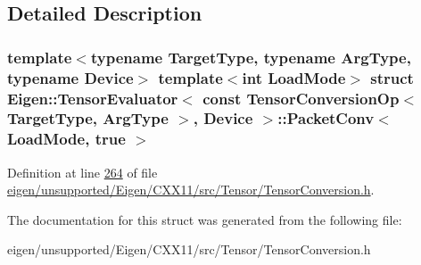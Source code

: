 \subsection{Detailed Description}
\subsubsection*{template$<$typename Target\+Type, typename Arg\+Type, typename Device$>$\newline
template$<$int Load\+Mode$>$\newline
struct Eigen\+::\+Tensor\+Evaluator$<$ const Tensor\+Conversion\+Op$<$ Target\+Type, Arg\+Type $>$, Device $>$\+::\+Packet\+Conv$<$ Load\+Mode, true $>$}



Definition at line \hyperlink{eigen_2unsupported_2_eigen_2_c_x_x11_2src_2_tensor_2_tensor_conversion_8h_source_l00264}{264} of file \hyperlink{eigen_2unsupported_2_eigen_2_c_x_x11_2src_2_tensor_2_tensor_conversion_8h_source}{eigen/unsupported/\+Eigen/\+C\+X\+X11/src/\+Tensor/\+Tensor\+Conversion.\+h}.



The documentation for this struct was generated from the following file\+:\begin{DoxyCompactItemize}
\item 
eigen/unsupported/\+Eigen/\+C\+X\+X11/src/\+Tensor/\+Tensor\+Conversion.\+h\end{DoxyCompactItemize}
